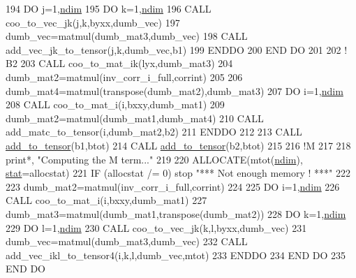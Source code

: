 \begin{DoxyCode}
194     \textcolor{keywordflow}{DO} j=1,\hyperlink{namespaceparams_a2323fe1773f086e20c14f266351c482b}{ndim}
195        \textcolor{keywordflow}{DO} k=1,\hyperlink{namespaceparams_a2323fe1773f086e20c14f266351c482b}{ndim}
196           \textcolor{keyword}{CALL }coo\_to\_vec\_jk(j,k,byxx,dumb\_vec)
197           dumb\_vec=matmul(dumb\_mat3,dumb\_vec)
198           \textcolor{keyword}{CALL }add\_vec\_jk\_to\_tensor(j,k,dumb\_vec,b1)
199 \textcolor{keywordflow}{       ENDDO}
200 \textcolor{keywordflow}{    END DO}
201 
202     \textcolor{comment}{! B2}
203     \textcolor{keyword}{CALL }coo\_to\_mat\_ik(lyx,dumb\_mat3)
204     dumb\_mat2=matmul(inv\_corr\_i\_full,corrint)
205 
206     dumb\_mat4=matmul(transpose(dumb\_mat2),dumb\_mat3)
207     \textcolor{keywordflow}{DO} i=1,\hyperlink{namespaceparams_a2323fe1773f086e20c14f266351c482b}{ndim}
208        \textcolor{keyword}{CALL }coo\_to\_mat\_i(i,bxxy,dumb\_mat1)
209        dumb\_mat2=matmul(dumb\_mat1,dumb\_mat4)
210        \textcolor{keyword}{CALL }add\_matc\_to\_tensor(i,dumb\_mat2,b2)
211 \textcolor{keywordflow}{    ENDDO}
212 
213     \textcolor{keyword}{CALL }\hyperlink{namespacetensor_aad7cd55f3a4cec4676cc7ca34b05f1a8}{add\_to\_tensor}(b1,btot)
214     \textcolor{keyword}{CALL }\hyperlink{namespacetensor_aad7cd55f3a4cec4676cc7ca34b05f1a8}{add\_to\_tensor}(b2,btot)
215 
216     \textcolor{comment}{!M}
217 
218     print*, \textcolor{stringliteral}{"Computing the M term..."}
219 
220     \textcolor{keyword}{ALLOCATE}(mtot(\hyperlink{namespaceparams_a2323fe1773f086e20c14f266351c482b}{ndim}), \hyperlink{namespacestat}{stat}=allocstat)
221     \textcolor{keywordflow}{IF} (allocstat /= 0) stop \textcolor{stringliteral}{"*** Not enough memory ! ***"}
222 
223     dumb\_mat2=matmul(inv\_corr\_i\_full,corrint)
224 
225     \textcolor{keywordflow}{DO} i=1,\hyperlink{namespaceparams_a2323fe1773f086e20c14f266351c482b}{ndim}
226        \textcolor{keyword}{CALL }coo\_to\_mat\_i(i,bxxy,dumb\_mat1)
227        dumb\_mat3=matmul(dumb\_mat1,transpose(dumb\_mat2))
228        \textcolor{keywordflow}{DO} k=1,\hyperlink{namespaceparams_a2323fe1773f086e20c14f266351c482b}{ndim}
229           \textcolor{keywordflow}{DO} l=1,\hyperlink{namespaceparams_a2323fe1773f086e20c14f266351c482b}{ndim}
230              \textcolor{keyword}{CALL }coo\_to\_vec\_jk(k,l,byxx,dumb\_vec)
231              dumb\_vec=matmul(dumb\_mat3,dumb\_vec)
232              \textcolor{keyword}{CALL }add\_vec\_ikl\_to\_tensor4(i,k,l,dumb\_vec,mtot)
233 \textcolor{keywordflow}{          ENDDO}
234 \textcolor{keywordflow}{       END DO}
235 \textcolor{keywordflow}{    END DO}

\end{DoxyCode}
